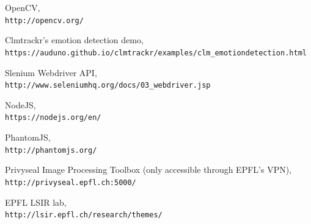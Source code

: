 \documentclass{article}
\begin{document}
\begin{thebibliography}{20}
OpenCV,
\\\texttt{http://opencv.org/}

Clmtrackr's emotion detection demo,
\\\texttt{https://auduno.github.io/clmtrackr/examples/clm\_emotiondetection.html}

Slenium Webdriver API,
\\\texttt{http://www.seleniumhq.org/docs/03\_webdriver.jsp}

NodeJS,
\\\texttt{https://nodejs.org/en/}

PhantomJS,
\\\texttt{http://phantomjs.org/}

Privyseal Image Processing Toolbox (only accessible through EPFL's VPN),
\\\texttt{http://privyseal.epfl.ch:5000/}

EPFL LSIR lab,
\\\texttt{http://lsir.epfl.ch/research/themes/}

\end{thebibliography}
\end{document}
